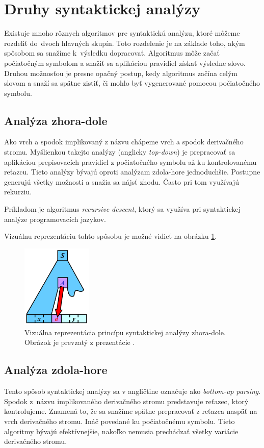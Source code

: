 \section{Druhy syntaktickej analýzy}
\label{analysysTypes}
Existuje mnoho rôznych algoritmov pre syntaktickú analýzu, ktoré môžeme rozdeliť do~dvoch hlavných skupín. Toto rozdelenie je na základe toho, akým spôsobom sa snažíme k~výsledku dopracovať. Algoritmus môže začať počiatočným symbolom a snažiť sa aplikáciou pravidiel získať výsledne slovo. Druhou možnosťou je presne opačný postup, kedy algoritmus začína celým slovom a snaží sa spätne zistiť, či mohlo byť vygenerované pomocou počiatočného symbolu.



\subsection*{Analýza zhora-dole}
Ako vrch a spodok implikovaný z názvu chápeme vrch a spodok derivačného stromu. Myšlienkou takejto analýzy (anglicky \textit{top-down}) je prepracovať sa aplikáciou prepisovacích pravidiel z počiatočného symbolu až ku kontrolovanému reťazcu. Tieto analýzy bývajú oproti analýzam zdola-hore jednoduchšie. Postupne generujú všetky možnosti a snažia sa nájsť zhodu. Často pri tom využívajú rekurziu.

Príkladom je algoritmus \textit{recursive descent}, ktorý sa využíva pri syntaktickej analýze programovacích jazykov.

Vizuálnu reprezentáciu tohto spôsobu je možné vidieť na obrázku \ref{topDownPicture}.

\begin{figure}[hbt]
	\centering
	\includegraphics[width=0.3\textwidth]{obrazky-figures/topDown.png}
	\caption{Vizuálna reprezentácia princípu syntaktickej analýzy zhora-dole. Obrázok je prevzatý z prezentácie \cite{IFJPresentation}.}
	\label{topDownPicture}
\end{figure}

\subsection*{Analýza zdola-hore}
Tento spôsob syntaktickej analýzy sa v angličtine označuje ako \textit{bottom-up parsing}. Spodok z~názvu implikovaného derivačného stromu predstavuje reťazec, ktorý kontrolujeme. Znamená to, že sa snažíme spätne prepracovať z reťazca naspäť na vrch derivačného stromu. Ináč povedané ku počiatočnému symbolu. Tieto algoritmy bývajú efektívnejšie, nakoľko nemusia prechádzať všetky variácie derivačného stromu.

